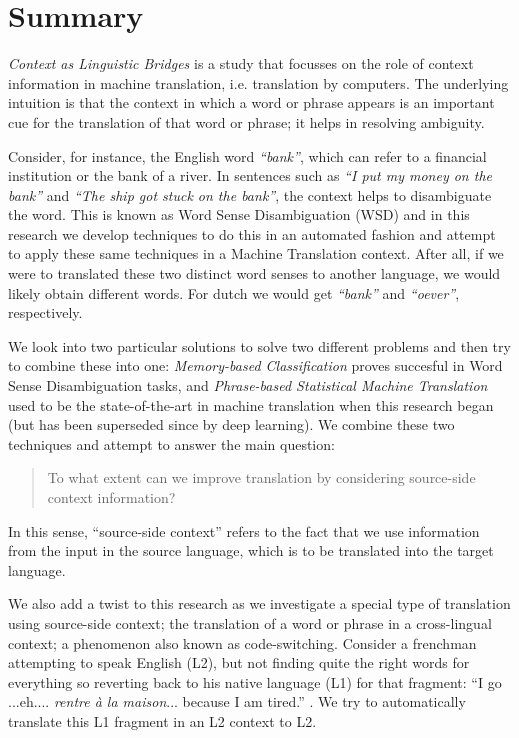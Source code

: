 \chapter*{Summary}

\emph{Context as Linguistic Bridges} is a study that focusses on the role of
context information in machine translation, i.e. translation by computers.  The
underlying intuition is that the context in which a word or phrase appears is
an important cue for the translation of that word or phrase; it helps in
resolving ambiguity.

Consider, for instance, the English word \emph{``bank''}, which can refer to a
financial institution or the bank of a river. In sentences such as \emph{``I
put my money on the bank''} and \emph{``The ship got stuck on the bank''}, the
context helps to disambiguate the word. This is known as Word Sense
Disambiguation (WSD) and in this research we develop techniques to do this
in an automated fashion and attempt to apply these same techniques in a Machine
Translation context. After all, if we were to translated these two distinct
word senses to another language, we would likely obtain different words. For
dutch we would get \emph{``bank''} and \emph{``oever''}, respectively.

We look into two particular solutions to solve two different problems and then
try to combine these into one: \emph{Memory-based Classification} proves
succesful in Word Sense Disambiguation tasks, and \emph{Phrase-based
Statistical Machine Translation} used to be the state-of-the-art in machine
translation when this research began (but has been superseded since by deep
learning). We combine these two techniques and attempt to answer the main
question:

\begin{quote}
To what extent can we improve translation by considering source-side context information?
\end{quote}

In this sense, ``source-side context'' refers to the fact that we use
information from the input in the source language, which is to be translated
into the target language.

We also add a twist to this research as we investigate a special type of
translation using source-side context; the translation of a word or phrase in a
cross-lingual context; a phenomenon also known as code-switching. Consider a
frenchman attempting to speak English (L2), but not finding quite the right
words for everything so reverting back to his native language (L1) for that
fragment: ``I go ...eh.... \emph{rentre à la maison}... because I am tired.''
. We try to automatically translate this L1 fragment in an L2 context to L2.

